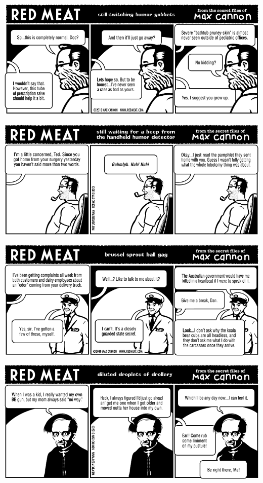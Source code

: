 \documentclass[a4paper,twoside,11pt]{article}
\begin{document}
\includegraphics[width=\textwidth]{redmeat_2010-09-21.png}



\includegraphics[width=\textwidth]{redmeat_2010-09-28.png}



\includegraphics[width=\textwidth]{redmeat_2010-10-05.png}



\includegraphics[width=\textwidth]{redmeat_2010-10-12.png}
\end{document}
